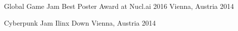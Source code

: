 

\begin{cvhonors}


\cvhonor
{Global Game Jam} %
{Best Poster Award at Nucl.ai 2016} %
{Vienna, Austria} %
{2014} %

\cvhonor
{Cyberpunk Jam} %
{Ilinx Down} %
{Vienna, Austria} %
{2014} %


\end{cvhonors}
